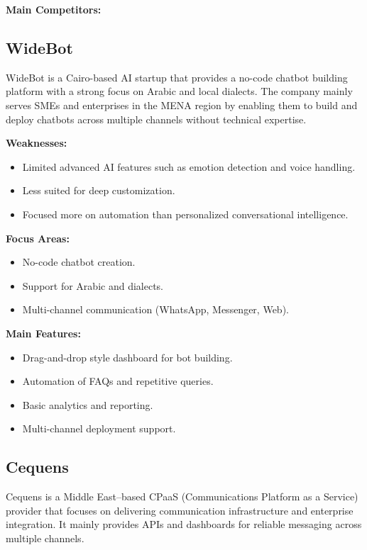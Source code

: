\documentclass[20pt,a4paper]{article}
\begin{document}
\textbf{Main Competitors:}

\subsection*{WideBot}

WideBot is a Cairo-based AI startup that provides a no-code chatbot building platform 
with a strong focus on Arabic and local dialects. The company mainly serves SMEs and 
enterprises in the MENA region by enabling them to build and deploy chatbots across 
multiple channels without technical expertise.

\textbf{Weaknesses:}
\begin{itemize}
    \item Limited advanced AI features such as emotion detection and voice handling.
    \item Less suited for deep customization.
    \item Focused more on automation than personalized conversational intelligence.
\end{itemize}

\textbf{Focus Areas:}
\begin{itemize}
    \item No-code chatbot creation.
    \item Support for Arabic and dialects.
    \item Multi-channel communication (WhatsApp, Messenger, Web).
\end{itemize}

\textbf{Main Features:}
\begin{itemize}
    \item Drag-and-drop style dashboard for bot building.
    \item Automation of FAQs and repetitive queries.
    \item Basic analytics and reporting.
    \item Multi-channel deployment support.
\end{itemize}

\subsection*{Cequens}

Cequens is a Middle East--based CPaaS (Communications Platform as a Service) provider 
that focuses on delivering communication infrastructure and enterprise integration. 
It mainly provides APIs and dashboards for reliable messaging across multiple channels.
\end{document}
